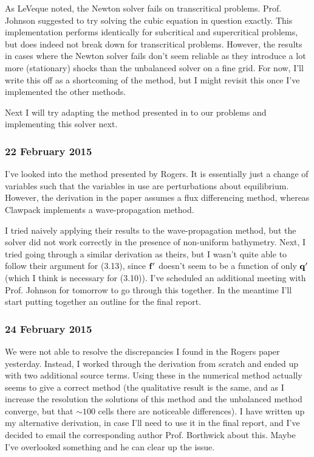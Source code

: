\documentclass[a4paper,onecolumn,11pt]{report}
\begin{document}
As LeVeque noted, the Newton solver fails on transcritical problems. Prof. Johnson suggested to try solving the cubic equation in question exactly. This implementation performs identically for subcritical and supercritical problems, but does indeed not break down for transcritical problems. However, the results in cases where the Newton solver fails don't seem reliable as they introduce a lot more (stationary) shocks than the unbalanced solver on a fine grid. For now, I'll write this off as a shortcoming of the method, but I might revisit this once I've implemented the other methods.

Next I will try adapting the method presented in \citet{rogers2003mathematical} to our problems and implementing this solver next.

\subsubsection*{22 February 2015}

I've looked into the method presented by Rogers. It is essentially just a change of variables such that the variables in use are perturbations about equilibrium. However, the derivation in the paper assumes a flux differencing method, whereas Clawpack implements a wave-propagation method.

I tried naively applying their results to the wave-propagation method, but the solver did not work correctly in the presence of non-uniform bathymetry. Next, I tried going through a similar derivation as theirs, but I wasn't quite able to follow their argument for (3.13), since $\vb{f'}$ doesn't seem to be a function of only $\vb{q'}$ (which I think is necessary for (3.10)). I've scheduled an additional meeting with Prof. Johnson for tomorrow to go through this together. In the meantime I'll start putting together an outline for the final report.

\subsubsection*{24 February 2015}

We were not able to resolve the discrepancies I found in the Rogers paper yesterday. Instead, I worked through the derivation from scratch and ended up with two additional source terms. Using these in the numerical method actually seems to give a correct method (the qualitative result is the same, and as I increase the resolution the solutions of this method and the unbalanced method converge, but that $\sim 100$ cells there are noticeable differences). I have written up my alternative derivation, in case I'll need to use it in the final report, and I've decided to email the corresponding author Prof. Borthwick about this. Maybe I've overlooked something and he can clear up the issue.
\end{document}
